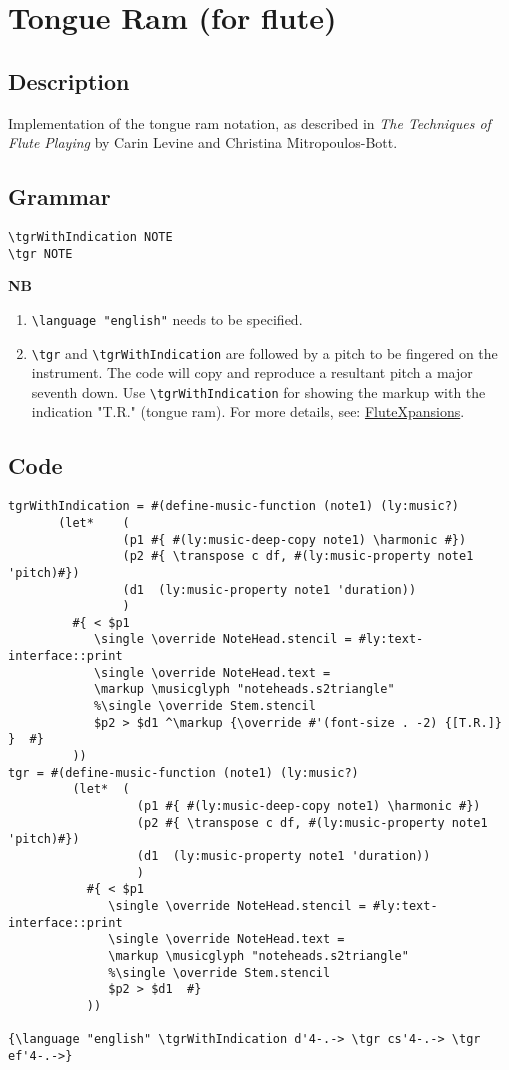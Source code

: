 

\section {Tongue Ram (for flute)}
\hfill
\subsection{Description}
Implementation of the tongue ram notation, as described in \textit{The Techniques of Flute Playing} by Carin Levine and Christina Mitropoulos-Bott.\autocite[28]{RN1695} 
\subsection{Grammar}
\begin{verbatim}
\tgrWithIndication NOTE
\tgr NOTE
\end{verbatim}
\textbf{NB} \begin{enumerate}
\item \verb|\language "english"| needs to be specified. 
\item \verb|\tgr| and \verb|\tgrWithIndication| are followed by a pitch to be fingered on the instrument. The code will copy and reproduce a resultant pitch a major seventh down. Use \verb|\tgrWithIndication| for showing the markup with the indication "T.R." (tongue ram). For more details, see: \href{https://www.flutexpansions.com/tongue-ram}{FluteXpansions}.
\end{enumerate}
\subsection{Code}
\begin{verbatim}
tgrWithIndication = #(define-music-function (note1) (ly:music?)
       (let* 	(
                (p1 #{ #(ly:music-deep-copy note1) \harmonic #})
                (p2 #{ \transpose c df, #(ly:music-property note1 'pitch)#})
                (d1  (ly:music-property note1 'duration))
                )
         #{ < $p1
            \single \override NoteHead.stencil = #ly:text-interface::print
            \single \override NoteHead.text =
            \markup \musicglyph "noteheads.s2triangle"
            %\single \override Stem.stencil
            $p2 > $d1 ^\markup {\override #'(font-size . -2) {[T.R.]} }  #}
         ))
tgr = #(define-music-function (note1) (ly:music?)
         (let* 	(
                  (p1 #{ #(ly:music-deep-copy note1) \harmonic #})
                  (p2 #{ \transpose c df, #(ly:music-property note1 'pitch)#})
                  (d1  (ly:music-property note1 'duration))
                  )
           #{ < $p1
              \single \override NoteHead.stencil = #ly:text-interface::print
              \single \override NoteHead.text =
              \markup \musicglyph "noteheads.s2triangle"
              %\single \override Stem.stencil
              $p2 > $d1  #}
           ))

{\language "english" \tgrWithIndication d'4-.-> \tgr cs'4-.-> \tgr ef'4-.->}
\end{verbatim}
